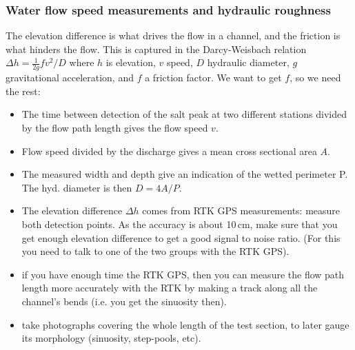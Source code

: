 \documentclass[DIV=15,halfparskip,11pt,headinclude]{scrartcl}
\begin{document}

\subsubsection{Water flow speed measurements and hydraulic roughness}

The elevation difference is what drives the flow in a channel, and the
friction is what hinders the flow.  This is captured in the
Darcy-Weisbach relation $\Delta h = \frac{1}{2g} f v^2/D$ where $h$ is
elevation, $v$ speed, $D$ hydraulic diameter, $g$ gravitational
acceleration, and $f$ a friction factor.  We want to get $f$, so we
need the rest:

\begin{itemize}
\item The time between detection of the salt peak at two different stations
  divided by the flow path length gives the flow speed $v$.
\item Flow speed divided by the discharge gives a mean cross sectional
  area $A$.
\item The measured width and depth give an indication of the wetted
perimeter P.  The hyd. diameter is then $D = 4A/P$.
\item The elevation difference $\Delta h$ comes from RTK GPS measurements: measure both
detection points.  As the accuracy is about 10\,cm,
make sure that you get enough elevation difference to get a good
signal to noise ratio.  (For this you need to talk to one of the two
groups with the RTK GPS).
\item if you have enough time the RTK GPS, then you can measure the
  flow path length more accurately with the RTK by making a track
  along all the channel's bends (i.e. you get the sinuosity then).
\item take photographs covering the whole length of the test section,
  to later gauge its morphology (sinuosity, step-pools, etc).
\end{itemize}


\end{document}
